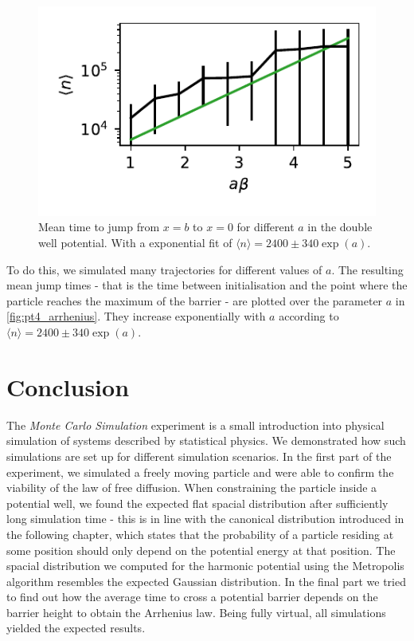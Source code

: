 \documentclass[
    parskip=half, 
    twoside=false,
    twocolumn=true,
    fontsize=11pt,
]{scrarticle}
\begin{document}
\begin{figure}
    \centering
    \includegraphics{figures/04 chem.pdf}
    \caption{
        Mean time to jump from $x=b$ to $x=0$ for different $a$ in the double well potential.
        With a exponential fit of $\langle n \rangle = 2400\pm 340 \exp\left(a\right)$.
    }
    \label{fig:pt4_arrhenius}
\end{figure}
To do this, we simulated many trajectories for different values of $a$. The resulting mean jump times - that is the time between initialisation and the point where the particle reaches the maximum of the barrier - are plotted over the parameter $a$ in \autoref{fig:pt4_arrhenius}. They increase exponentially with $a$ according to $\langle n \rangle = 2400\pm 340 \exp\left(a\right)$.

\section{Conclusion}

The \textit{Monte Carlo Simulation} experiment is a small introduction into physical simulation of systems described by statistical physics. We demonstrated how such simulations are set up for different simulation scenarios. In the first part of the experiment, we simulated a freely moving particle and were able to confirm the viability of the law of free diffusion. When constraining the particle inside a potential well, we found the expected flat spacial distribution after sufficiently long simulation time - this is in line with the canonical distribution introduced in the following chapter, which states that the probability of a particle residing at some position should only depend on the potential energy at that position. The spacial distribution we computed for the harmonic potential using the Metropolis algorithm resembles the expected Gaussian distribution. In the final part we tried to find out how the average time to cross a potential barrier depends on the barrier height to obtain the Arrhenius law. Being fully virtual, all simulations yielded the expected results.

\nocite{*}
\printbibliography
\end{document}
